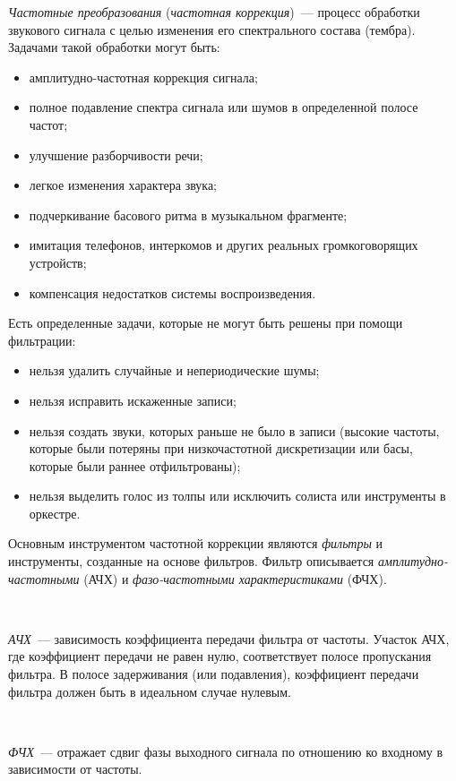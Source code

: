 \documentclass{beamer}
\begin{document}
\begin{frame}
\emph{Частотные преобразования} (\emph{частотная коррекция})~--– процесс обработки звукового сигнала с целью изменения его спектрального состава (тембра).
Задачами такой обработки могут быть:
\begin{itemize}
  \item амплитудно-частотная коррекция сигнала;
  \item полное подавление спектра сигнала или шумов в определенной полосе частот;
  \item улучшение разборчивости речи;
  \item легкое изменения характера звука;
  \item подчеркивание басового ритма в музыкальном фрагменте;
  \item имитация телефонов, интеркомов и других реальных громкоговорящих устройств;
  \item компенсация недостатков системы воспроизведения.
\end{itemize}
\end{frame}

\begin{frame}
Есть определенные задачи, которые не могут быть решены при помощи фильтрации:
\begin{itemize}
  \item нельзя удалить случайные и непериодические шумы;
  \item нельзя исправить искаженные записи;
  \item нельзя создать звуки, которых раньше не было в записи (высокие частоты, которые были потеряны при низкочастотной дискретизации или басы, которые были раннее отфильтрованы);
  \item нельзя выделить голос из толпы или исключить солиста или инструменты в оркестре.
\end{itemize}
\end{frame}

\begin{frame}
Основным инструментом частотной коррекции являются \emph{фильтры} и инструменты, созданные на основе фильтров. Фильтр описывается \emph{амплитудно-частотными} (АЧХ) и \emph{фазо-частотными характеристиками} (ФЧХ).

~

\emph{АЧХ}~--- зависимость коэффициента передачи фильтра от частоты. Участок АЧХ, где коэффициент передачи не равен нулю, соответствует полосе пропускания фильтра. В полосе задерживания (или подавления), коэффициент передачи фильтра должен быть в идеальном случае нулевым. 

~

\emph{ФЧХ}~--- отражает сдвиг фазы выходного сигнала по отношению ко входному в зависимости от частоты.
\end{frame}
\end{document}
